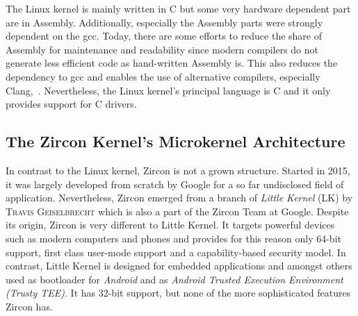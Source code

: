 The Linux kernel is mainly written in C but some very hardware dependent part are in Assembly. 
Additionally, especially the Assembly parts were strongly dependent on the \ac{gcc}.
Today, there are some efforts to reduce the share of Assembly for maintenance and readability since modern compilers do not generate less efficient code as hand-written Assembly is\cite{programming-religion}.
This also reduces the dependency to \ac{gcc} and enables the use of alternative compilers, especially Clang\cite{linux-clang},~\cite{fosdem-linux-llvm}.
Nevertheless, the Linux kernel's principal language is C and it only provides support for C drivers. 


\subsection{The Zircon Kernel's Microkernel Architecture}
In contrast to the Linux kernel, Zircon is not a grown structure.
Started in 2015, it was largely developed from scratch by Google for a so far undisclosed field of application\cite{chat-zircon-arch}.
Nevertheless, Zircon emerged from a branch of \textit{Little Kernel} (LK) by \textsc{Travis Geiselbrecht} which is also a part of the Zircon Team at Google\cite{zircon-vs-lk}. 
Despite its origin, Zircon is very different to Little Kernel.
It targets powerful devices such as modern computers and phones and provides for this reason only 64-bit support, first class user-mode support and a capability-based security model. 
In contrast, Little Kernel is designed for embedded applications and amongst others used as bootloader for \textit{Android} and as \textit{Android Trusted Execution Environment (Trusty TEE)}\cite{lk-intro}.
It has 32-bit support, but none of the more sophisticated features Zircon has\cite{zircon-vs-lk}.

